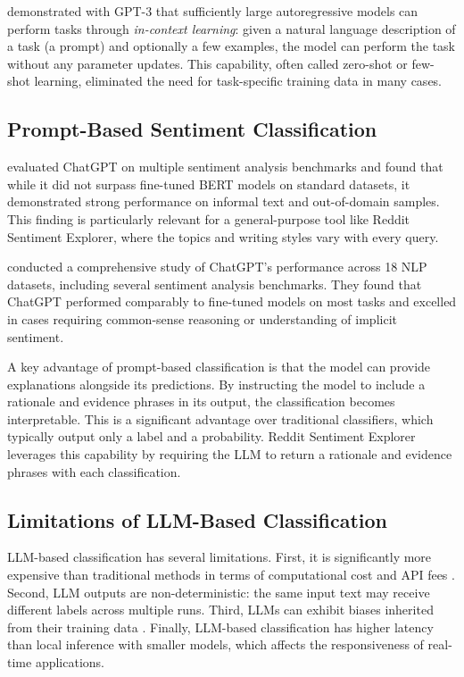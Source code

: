  demonstrated with GPT-3 that sufficiently large autoregressive models can perform tasks through \emph{in-context learning}: given a natural language description of a task (a prompt) and optionally a few examples, the model can perform the task without any parameter updates. This capability, often called zero-shot or few-shot learning, eliminated the need for task-specific training data in many cases.

\subsection{Prompt-Based Sentiment Classification}

 evaluated ChatGPT on multiple sentiment analysis benchmarks and found that while it did not surpass fine-tuned BERT models on standard datasets, it demonstrated strong performance on informal text and out-of-domain samples. This finding is particularly relevant for a general-purpose tool like Reddit Sentiment Explorer, where the topics and writing styles vary with every query.

 conducted a comprehensive study of ChatGPT's performance across 18 NLP datasets, including several sentiment analysis benchmarks. They found that ChatGPT performed comparably to fine-tuned models on most tasks and excelled in cases requiring common-sense reasoning or understanding of implicit sentiment.

A key advantage of prompt-based classification is that the model can provide explanations alongside its predictions. By instructing the model to include a rationale and evidence phrases in its output, the classification becomes interpretable. This is a significant advantage over traditional classifiers, which typically output only a label and a probability. Reddit Sentiment Explorer leverages this capability by requiring the LLM to return a rationale and evidence phrases with each classification.

\subsection{Limitations of LLM-Based Classification}

LLM-based classification has several limitations. First, it is significantly more expensive than traditional methods in terms of computational cost and API fees \cite{sun2023text}. Second, LLM outputs are non-deterministic: the same input text may receive different labels across multiple runs. Third, LLMs can exhibit biases inherited from their training data \cite{gallegos2024bias}. Finally, LLM-based classification has higher latency than local inference with smaller models, which affects the responsiveness of real-time applications.

